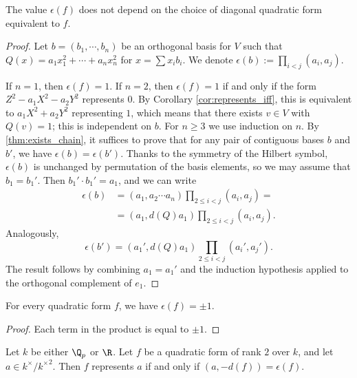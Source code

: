 \begin{lemma}\label{lem:HM_inv_well_defined}
\leanok
The value $\epsilon(f)$ does not depend on the choice of diagonal quadratic form equivalent to $f$.
\end{lemma}
\begin{proof}
Let $b = (b_1, \cdots, b_n)$ be an orthogonal basis for $V$ such that $Q(x) = a_1 x_1^2 + \cdots + a_n x_n^2$ for $x = \sum x_i b_i$. We denote  $\epsilon(b) := \prod_{i < j}(a_i, a_j)$. 

If $n=1$, then $\epsilon(f) = 1$. If $n=2$, then $\epsilon(f) = 1$ if and only if the form $Z^2 - a_1 X^2 - a_2 Y^2$ represents $0$. By Corollary \ref{cor:represents_iff}, this is equivalent to $a_1 X^2 + a_2 Y^2$ representing $1$, which means that there exists $v \in V$ with $Q(v) = 1$; this is independent on $b$. 
For $n \ge 3$ we use induction on $n$. By \ref{thm:exists_chain}, it suffices to prove that for any pair of contiguous bases $b$ and $b'$, we have $\epsilon(b) = \epsilon(b')$. 
Thanks to the symmetry of the Hilbert symbol, $\epsilon(b)$ is unchanged by permutation of the basis elements, so we may assume that $b_1 = b_1'$.
Then $b_1' \cdot b_1' = a_1$, and we can write 
\begin{align*}
	\epsilon(b) &= (a_1, a_2 \cdots a_n) \prod_{2 \le i < j} (a_i, a_j) = \\
	&= (a_1, d(Q) a_1) \prod_{2 \le i < j} (a_i, a_j).
\end{align*}
Analogously, \[\epsilon(b') = (a_1', d(Q) a_1) \prod_{2 \le i < j} (a_i', a_j'). \]
The result follows by combining $a_1 = a_1'$ and the induction hypothesis applied to the orthogonal complement of $e_1$.
\end{proof}

\begin{lemma}\label{lem:HM_inv_pm_one}
\leanok
For every quadratic form $f$, we have $\epsilon(f) = \pm 1$.
\end{lemma}
\begin{proof}
Each term in the product is equal to $\pm 1$.
\end{proof}

\begin{lemma}\label{lem:represents_zero_iff_rk_3}
\leanok
{}
Let $k$ be either $\Q_p$ or $\R$. Let $f$ be a quadratic form of rank $2$ over $k$, and let $a \in k^\times / {k^\times}^2$. Then $f$ represents $a$ if and only if $(a, -d(f)) = \epsilon(f)$.
\end{lemma}


